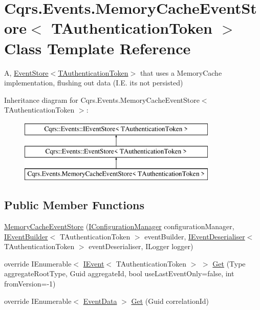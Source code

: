 \hypertarget{classCqrs_1_1Events_1_1MemoryCacheEventStore}{}\section{Cqrs.\+Events.\+Memory\+Cache\+Event\+Store$<$ T\+Authentication\+Token $>$ Class Template Reference}
\label{classCqrs_1_1Events_1_1MemoryCacheEventStore}


A, \hyperlink{classCqrs_1_1Events_1_1EventStore_a6346cb2aea4c5b4e740dc6cfb15abab8_a6346cb2aea4c5b4e740dc6cfb15abab8}{Event\+Store$<$\+T\+Authentication\+Token$>$} that uses a Memory\+Cache implementation, flushing out data (I.\+E. it\textquotesingle{}s not persisted)  


Inheritance diagram for Cqrs.\+Events.\+Memory\+Cache\+Event\+Store$<$ T\+Authentication\+Token $>$\+:\begin{figure}[H]
\begin{center}
\leavevmode
\includegraphics[height=3.000000cm]{classCqrs_1_1Events_1_1MemoryCacheEventStore}
\end{center}
\end{figure}
\subsection*{Public Member Functions}
\begin{DoxyCompactItemize}
\item 
\hyperlink{classCqrs_1_1Events_1_1MemoryCacheEventStore_a4de9139e05d35cb62ba295569a1dc94f_a4de9139e05d35cb62ba295569a1dc94f}{Memory\+Cache\+Event\+Store} (\hyperlink{interfaceCqrs_1_1Configuration_1_1IConfigurationManager}{I\+Configuration\+Manager} configuration\+Manager, \hyperlink{interfaceCqrs_1_1Events_1_1IEventBuilder}{I\+Event\+Builder}$<$ T\+Authentication\+Token $>$ event\+Builder, \hyperlink{interfaceCqrs_1_1Events_1_1IEventDeserialiser}{I\+Event\+Deserialiser}$<$ T\+Authentication\+Token $>$ event\+Deserialiser, I\+Logger logger)
\item 
override I\+Enumerable$<$ \hyperlink{interfaceCqrs_1_1Events_1_1IEvent}{I\+Event}$<$ T\+Authentication\+Token $>$ $>$ \hyperlink{classCqrs_1_1Events_1_1MemoryCacheEventStore_a1391c260f52f5cf18058cf88ad2d16de_a1391c260f52f5cf18058cf88ad2d16de}{Get} (Type aggregate\+Root\+Type, Guid aggregate\+Id, bool use\+Last\+Event\+Only=false, int from\+Version=-\/1)
\item 
override I\+Enumerable$<$ \hyperlink{classCqrs_1_1Events_1_1EventData}{Event\+Data} $>$ \hyperlink{classCqrs_1_1Events_1_1MemoryCacheEventStore_a2a93a3f10423f608527fbc41a7ce8cef_a2a93a3f10423f608527fbc41a7ce8cef}{Get} (Guid correlation\+Id)
\end{DoxyCompactItemize}
